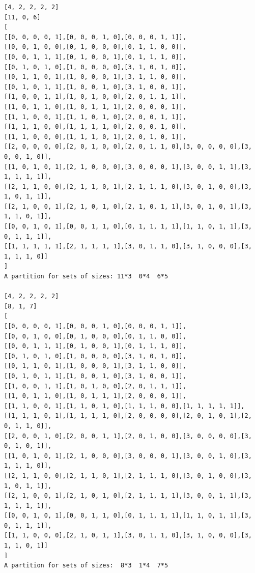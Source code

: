 \documentclass[final]{dmtcs-episciences}
\begin{document}
\begin{appendices}
\begin{verbatim}
[4, 2, 2, 2, 2]
[11, 0, 6]
[
[[0, 0, 0, 0, 1],[0, 0, 0, 1, 0],[0, 0, 0, 1, 1]],
[[0, 0, 1, 0, 0],[0, 1, 0, 0, 0],[0, 1, 1, 0, 0]],
[[0, 0, 1, 1, 1],[0, 1, 0, 0, 1],[0, 1, 1, 1, 0]],
[[0, 1, 0, 1, 0],[1, 0, 0, 0, 0],[3, 1, 0, 1, 0]],
[[0, 1, 1, 0, 1],[1, 0, 0, 0, 1],[3, 1, 1, 0, 0]],
[[0, 1, 0, 1, 1],[1, 0, 0, 1, 0],[3, 1, 0, 0, 1]],
[[1, 0, 0, 1, 1],[1, 0, 1, 0, 0],[2, 0, 1, 1, 1]],
[[1, 0, 1, 1, 0],[1, 0, 1, 1, 1],[2, 0, 0, 0, 1]],
[[1, 1, 0, 0, 1],[1, 1, 0, 1, 0],[2, 0, 0, 1, 1]],
[[1, 1, 1, 0, 0],[1, 1, 1, 1, 0],[2, 0, 0, 1, 0]],
[[1, 1, 0, 0, 0],[1, 1, 1, 0, 1],[2, 0, 1, 0, 1]],
[[2, 0, 0, 0, 0],[2, 0, 1, 0, 0],[2, 0, 1, 1, 0],[3, 0, 0, 0, 0],[3, 0, 0, 1, 0]],
[[1, 0, 1, 0, 1],[2, 1, 0, 0, 0],[3, 0, 0, 0, 1],[3, 0, 0, 1, 1],[3, 1, 1, 1, 1]],
[[2, 1, 1, 0, 0],[2, 1, 1, 0, 1],[2, 1, 1, 1, 0],[3, 0, 1, 0, 0],[3, 1, 0, 1, 1]],
[[2, 1, 0, 0, 1],[2, 1, 0, 1, 0],[2, 1, 0, 1, 1],[3, 0, 1, 0, 1],[3, 1, 1, 0, 1]],
[[0, 0, 1, 0, 1],[0, 0, 1, 1, 0],[0, 1, 1, 1, 1],[1, 1, 0, 1, 1],[3, 0, 1, 1, 1]],
[[1, 1, 1, 1, 1],[2, 1, 1, 1, 1],[3, 0, 1, 1, 0],[3, 1, 0, 0, 0],[3, 1, 1, 1, 0]]
]
A partition for sets of sizes: 11*3  0*4  6*5

[4, 2, 2, 2, 2]
[8, 1, 7]
[
[[0, 0, 0, 0, 1],[0, 0, 0, 1, 0],[0, 0, 0, 1, 1]],
[[0, 0, 1, 0, 0],[0, 1, 0, 0, 0],[0, 1, 1, 0, 0]],
[[0, 0, 1, 1, 1],[0, 1, 0, 0, 1],[0, 1, 1, 1, 0]],
[[0, 1, 0, 1, 0],[1, 0, 0, 0, 0],[3, 1, 0, 1, 0]],
[[0, 1, 1, 0, 1],[1, 0, 0, 0, 1],[3, 1, 1, 0, 0]],
[[0, 1, 0, 1, 1],[1, 0, 0, 1, 0],[3, 1, 0, 0, 1]],
[[1, 0, 0, 1, 1],[1, 0, 1, 0, 0],[2, 0, 1, 1, 1]],
[[1, 0, 1, 1, 0],[1, 0, 1, 1, 1],[2, 0, 0, 0, 1]],
[[1, 1, 0, 0, 1],[1, 1, 0, 1, 0],[1, 1, 1, 0, 0],[1, 1, 1, 1, 1]],
[[1, 1, 1, 0, 1],[1, 1, 1, 1, 0],[2, 0, 0, 0, 0],[2, 0, 1, 0, 1],[2, 0, 1, 1, 0]],
[[2, 0, 0, 1, 0],[2, 0, 0, 1, 1],[2, 0, 1, 0, 0],[3, 0, 0, 0, 0],[3, 0, 1, 0, 1]],
[[1, 0, 1, 0, 1],[2, 1, 0, 0, 0],[3, 0, 0, 0, 1],[3, 0, 0, 1, 0],[3, 1, 1, 1, 0]],
[[2, 1, 1, 0, 0],[2, 1, 1, 0, 1],[2, 1, 1, 1, 0],[3, 0, 1, 0, 0],[3, 1, 0, 1, 1]],
[[2, 1, 0, 0, 1],[2, 1, 0, 1, 0],[2, 1, 1, 1, 1],[3, 0, 0, 1, 1],[3, 1, 1, 1, 1]],
[[0, 0, 1, 0, 1],[0, 0, 1, 1, 0],[0, 1, 1, 1, 1],[1, 1, 0, 1, 1],[3, 0, 1, 1, 1]],
[[1, 1, 0, 0, 0],[2, 1, 0, 1, 1],[3, 0, 1, 1, 0],[3, 1, 0, 0, 0],[3, 1, 1, 0, 1]]
]
A partition for sets of sizes:  8*3  1*4  7*5


\end{verbatim}
\end{appendices}
\end{document}
